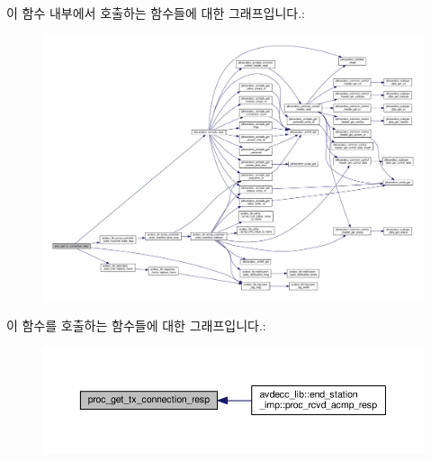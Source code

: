 이 함수 내부에서 호출하는 함수들에 대한 그래프입니다.\+:
\nopagebreak
\begin{figure}[H]
\begin{center}
\leavevmode
\includegraphics[width=350pt]{classavdecc__lib_1_1stream__output__descriptor__imp_a0bbae515470aac2f4fdcd9089ead527c_cgraph}
\end{center}
\end{figure}




이 함수를 호출하는 함수들에 대한 그래프입니다.\+:
\nopagebreak
\begin{figure}[H]
\begin{center}
\leavevmode
\includegraphics[width=350pt]{classavdecc__lib_1_1stream__output__descriptor__imp_a0bbae515470aac2f4fdcd9089ead527c_icgraph}
\end{center}
\end{figure}


